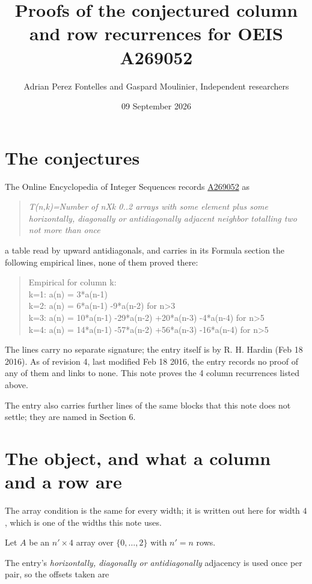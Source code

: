\documentclass[11pt]{article}
\title{Proofs of the conjectured column and row recurrences for OEIS A269052}
\author{Adrian Perez Fontelles and Gaspard Moulinier, Independent researchers}
\date{09 September 2026}
\theoremstyle{definition}
\begin{document}
\maketitle
\section{The conjectures}

The Online Encyclopedia of Integer Sequences records \href{https://oeis.org/A269052}{A269052} as

\begin{quote}\itshape T(n,k)=Number of nXk 0..2 arrays with some element plus some horizontally, diagonally or antidiagonally adjacent neighbor totalling two not more than once\end{quote}

a table read by upward antidiagonals, and carries in its Formula section the following empirical lines, none of them proved there:

\begin{quote}\ttfamily Empirical for column k:\\
k=1: a(n) = 3*a(n-1)\\k=2: a(n) = 6*a(n-1) -9*a(n-2) for n>3\\k=3: a(n) = 10*a(n-1) -29*a(n-2) +20*a(n-3) -4*a(n-4) for n>5\\k=4: a(n) = 14*a(n-1) -57*a(n-2) +56*a(n-3) -16*a(n-4) for n>5\end{quote}

The lines carry no separate signature; the entry itself is by R. H. Hardin (Feb 18 2016). As of revision 4, last modified Feb 18 2016, the entry records no proof of any of them and links to none. This note proves the 4 column recurrences listed above.

The entry also carries further lines of the same blocks that this note does not settle; they are named in Section 6.

\section{The object, and what a column and a row are}

The array condition is the same for every width; it is written out here for width $4$, which is one of the widths this note uses.

Let $A$ be an $n' \times 4$ array over $\{0,\dots,2\}$ with $n' = n$ rows.

The entry's {\itshape horizontally, diagonally or antidiagonally} adjacency is used once per pair, so the offsets taken are
\end{document}
